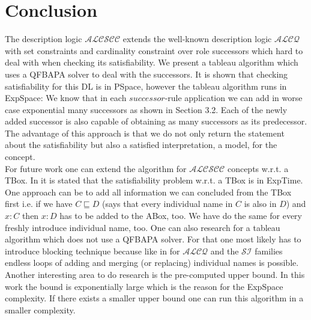 \documentclass{book}
\theoremstyle{break}
\theoremstyle{definition}
\begin{document}
\chapter{Conclusion}
The description logic $\mathcal{ALCSCC}$ extends the well-known description logic $\mathcal{ALCQ}$ with set constraints and cardinality constraint over role successors which hard to deal with when checking its satisfiability. We present a tableau algorithm which uses a QFBAPA solver to deal with the successors. It is shown that checking satisfiability for this DL is in PSpace, however the tableau algorithm runs in ExpSpace: We know that in each $successor$-rule application we can add in worse case exponential many successors as shown in Section 3.2. Each of the newly added successor is also capable of obtaining as many successors as its predecessor. The advantage of this approach is that we do not only return the statement about the satisfiability but also a satisfied interpretation, a model, for the concept.\\
For future work one can extend the algorithm for $\mathcal{ALCSCC}$ concepts w.r.t. a TBox. In \cite{4} it is stated that the satisfiability problem w.r.t. a TBox is in ExpTime. One approach can be to add all information we can concluded from the TBox first i.e. if we have $C\sqsubseteq D$ (says that every individual name in $C$ is also in $D$) and $x:C$ then $x:D$ has to be added to the ABox, too. We have do the same for every freshly introduce individual name, too. One can also research for a tableau algorithm which does not use a QFBAPA solver. For that one most likely has to introduce blocking technique because like in for $\mathcal{ALCQ}$ and the $\mathcal{SI}$ families endless loops of adding and merging (or replacing) individual names is possible. Another interesting area to do research is the pre-computed upper bound. In this work the bound is exponentially large which is the reason for the ExpSpace complexity. If there exists a smaller upper bound one can run this algorithm in a smaller complexity.
\normalem


\end{document}
